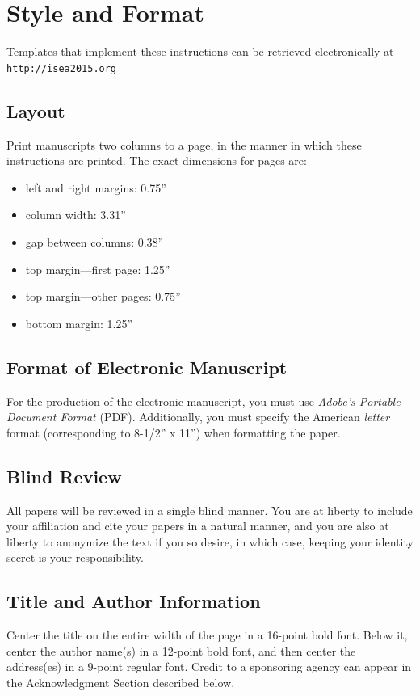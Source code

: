 \documentclass[letterpaper]{article}
\begin{document}
\section{Style and Format}
Templates that implement these instructions can be retrieved electronically at {\small \tt http://isea2015.org}

\subsection{Layout}

Print manuscripts two columns to a page, in the manner in which these instructions are printed. The exact dimensions for pages are:
\begin{itemize}
\item left and right margins: 0.75''
\item column width: 3.31''
\item gap between columns: 0.38''
\item top margin—first page: 1.25''
\item top margin—other pages: 0.75''
\item bottom margin: 1.25''
\end{itemize}

\subsection{Format of Electronic Manuscript}

For the production of the electronic manuscript, you must use {\em Adobe's Portable Document Format} (PDF). Additionally, you must specify the American {\em letter} format (corresponding to 8-1/2'' x 11'') when formatting the paper.

\subsection{Blind Review}

All papers will be reviewed in a single blind manner.  You are at liberty to include your affiliation and cite your papers in a natural manner, and you are also at liberty to anonymize the text if you so desire, in which case, keeping your identity secret is your responsibility.

\subsection{Title and Author Information}

Center the title on the entire width of the page in a 16-point bold font. Below it, center the author name(s) in a 12-point bold font, and then center the address(es) in a 9-point regular font. Credit to a sponsoring agency can appear in the Acknowledgment Section described below.
\end{document}
